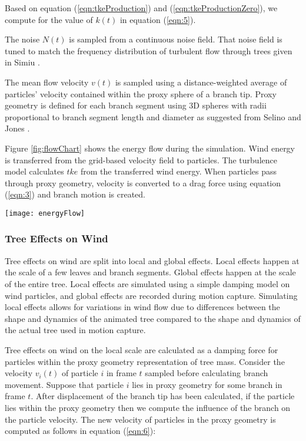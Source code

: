 Based on equation (\ref{eqn:tkeProduction}) and (\ref{eqn:tkeProductionZero}), we compute for the value of $k(t)$ in equation (\ref{eqn:5}).

The noise $N(t)$ is sampled from a continuous noise field. That noise field is tuned to match the frequency distribution of turbulent flow through trees given in Simiu \cite{simiu1996wind}.

The mean flow velocity $v(t)$ is sampled using a distance-weighted average of particles' velocity contained within the proxy sphere of a branch tip. Proxy geometry is defined for each branch segment using 3D spheres with radii proportional to branch segment length and diameter as suggested from Selino and Jones \cite{Selino:2012}. 

Figure \ref{fig:flowChart} shows the energy flow during the simulation. Wind energy is transferred from the grid-based velocity field to particles. The turbulence model calculates $tke$ from the transferred wind energy. When particles pass through proxy geometry, velocity is converted to a drag force using equation (\ref{eqn:3}) and branch motion is created. 

\begin{figure*}[!t]
\centering
\texttt{[image: energyFlow]}
\caption{Energy flow in a wind velocity field.}
\label{fig:flowChart}
\end{figure*}

\subsubsection{Tree Effects on Wind}

Tree effects on wind are split into local and global effects. Local effects happen at the scale of a few leaves and branch segments.  Global effects happen at the scale of the entire tree.  Local effects are simulated using a simple damping model on wind particles, and global effects are recorded during motion capture.  Simulating local effects allows for variations in wind flow due to differences between the shape and dynamics of the animated tree compared to the shape and dynamics of the actual tree used in motion capture. 

Tree effects on wind on the local scale are calculated as a damping force for particles within the proxy geometry representation of tree mass. Consider the velocity $v_i(t)$ of particle $i$ in frame $t$  sampled before calculating branch movement. Suppose that particle $i$ lies in proxy geometry for some branch in frame $t$. After displacement of the branch tip has been calculated, if the particle lies within the proxy geometry then we compute the influence of the branch on the particle velocity. The new velocity of particles in the proxy geometry is computed as follows in equation (\ref{eqn:6}):

